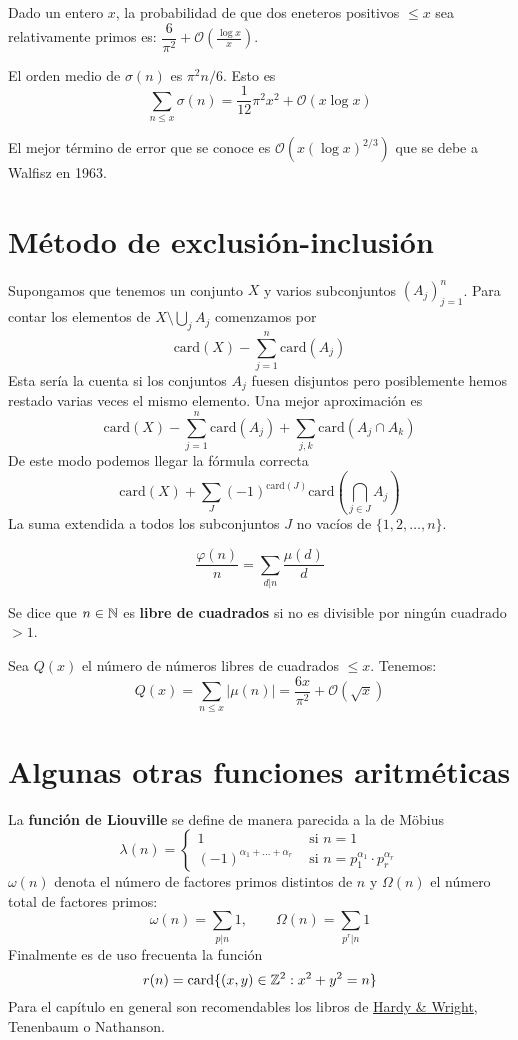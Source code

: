 \documentclass[TAN.tex]{subfiles}
\begin{document}
\begin{coro} Dado un entero $x$, la probabilidad de que dos eneteros positivos $≤x$ sea relativamente primos es: $\dfrac{6}{π^2}+ \mathcal{O}\left(\frac{\log x}{x}\right)$.
\end{coro}

\begin{prop}
El orden medio de $σ(n)$ es $π^2n/6$. Esto es
\[ \sum_{n≤x} σ(n) = \frac{1}{12} π^2x^2 + \mathcal{O}(x\log x) \]
\end{prop}
El mejor término de error que se conoce es $\mathcal{O}(x(\log x)^{2/3})$ que se debe a Walfisz en 1963.

\section{Método de exclusión-inclusión}
Supongamos que tenemos un conjunto $X$ y varios subconjuntos $(A_j)_{j=1}^n$. Para contar los elementos de $X \setminus \bigcup_j A_j$ comenzamos por
\[ \text{card}(X) - \sum_{j=1}^n \text{card}(A_j) \]
Esta sería la cuenta si los conjuntos $A_j$ fuesen disjuntos pero posiblemente hemos restado varias veces el mismo elemento. Una mejor aproximación es
\[ \text{card}(X) - \sum_{j=1}^n \text{card}(A_j) + \sum_{j,k} \text{card}(A_j \cap A_k) \]
De este modo podemos llegar la fórmula correcta
\[ \text{card}(X) + \sum_J (-1)^{\text{card}(J)} \text{card}\left(\bigcap_{j\in J} A_j\right) \]
La suma extendida a todos los subconjuntos $J$ no vacíos de $\{1,2,\dots,n\}$.

\begin{prop}
\[ \frac{φ(n)}{n} = \sum_{d|n} \frac{μ(d)}{d} \]
\end{prop}

Se dice que $n \in \mathbb{N}$ es \textbf{libre de cuadrados} si no es divisible por ningún cuadrado $> 1$.

\begin{teorema}
Sea $Q(x)$ el número de números libres de cuadrados $≤x$. Tenemos:
\[ Q(x) = \sum_{n≤x} |μ(n)| = \frac{6x}{π^2} + \mathcal{O}(\sqrt{x}) \]
\end{teorema}
\section{Algunas otras funciones aritméticas}
La \textbf{función de Liouville} se define de manera parecida a la de Möbius
\[ λ(n) = \begin{cases}
	1 &\text{ si }n=1\\
	(-1)^{α_1+\dots+α_r} &\text{ si }n=p_1^{α_1}\cdot p_r^{α_r}
\end{cases} \]
$ω(n)$ denota el número de factores primos distintos de $n$ y $Ω(n)$ el número total de factores primos:
\[ ω(n) = \sum_{p|n} 1, \qquad Ω(n) = \sum_{p^r|n} 1 \]
Finalmente es de uso frecuenta la función
\[ r(n) = \text{card}\{(x,y) \in \mathbb{Z}^2 : x^2+y^2=n\} \]
Para el capítulo en general son recomendables los libros de \href{https://leonettipaolo.files.wordpress.com/2012/07/ebook-english-g-h-hardy-an-introduction-to-the-theory-of-numbers.pdf}{Hardy \& Wright}, Tenenbaum o Nathanson.
\end{document}
